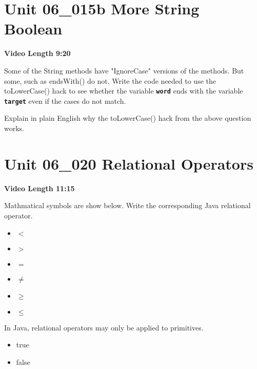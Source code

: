 \documentclass[letterpaper,12pt]{exam}
\newcommand{\unit}{Unit 06}
\begin{document}
\begin{questions}
\section*{\unit\_015b More String Boolean } %
\noindent \textbf{Video Length 9:20}

\begin{samepage}
    \question Some of the String methods have "IgnoreCase" versions of the methods.  But some, such as endsWith() do not.  Write the code needed to use the toLowerCase() hack to see whether the variable \texttt{\textbf{word}} ends with the variable \texttt{\textbf{target}} even if the cases do not match.
    \vspace{5mm}
\end{samepage}

\begin{samepage}
    \question Explain in plain English why the toLowerCase() hack from the above question works.
    \vspace{5mm}
\end{samepage}

\section*{\unit\_020 Relational Operators} %
\noindent \textbf{Video Length 11:15}

\begin{samepage}
    \question Mathmatical symbols are show below.  Write the corresponding Java relational operator.
      \begin{itemize}
        \item $<$
        \item $>$
        \item $=$
        \item $\neq$
        \item $\ge$
        \item $\le$
        \vspace{5mm}
       \end{itemize}
\end{samepage}

\begin{samepage}
    \question In Java, relational operators may only be applied to primitives.
      \begin{itemize}
        \item true
        \item false
       \end{itemize}
\end{samepage}
\clearpage

\end{questions}
\end{document}
